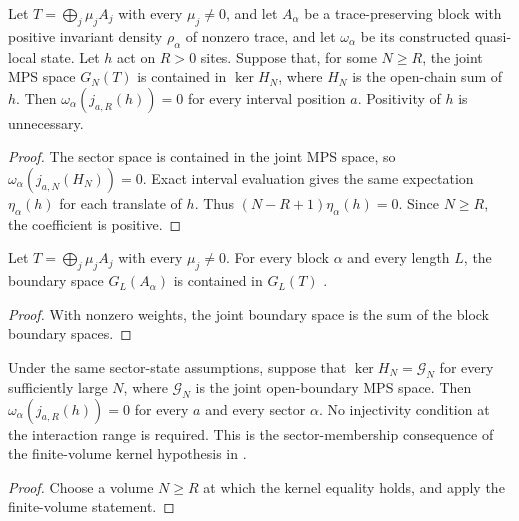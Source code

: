 \begin{lemma}
    \label{thm:sector_local_zero_from_open_kernel}
    \leanok
    Let $T=\bigoplus_j\mu_jA_j$ with every $\mu_j\neq0$, and let $A_\alpha$
    be a trace-preserving block with positive invariant density
    $\rho_\alpha$ of nonzero trace, and let $\omega_\alpha$ be its constructed
    quasi-local state. Let $h$ act on $R>0$ sites. Suppose that, for some
    $N\geq R$, the joint MPS space $G_N(T)$ is contained in $\ker H_N$, where $H_N$ is
    the open-chain sum of $h$. Then $\omega_\alpha(j_{a,R}(h))=0$ for every
    interval position $a$. Positivity of $h$ is unnecessary.
\end{lemma}
\begin{proof}\leanok
    The sector space is contained in the joint MPS space, so
    $\omega_\alpha(j_{a,N}(H_N))=0$. Exact interval evaluation gives the
    same expectation $\eta_\alpha(h)$ for each translate of $h$. Thus
    $(N-R+1)\eta_\alpha(h)=0$. Since $N\geq R$, the coefficient is positive.
\end{proof}

\begin{lemma}
    \label{thm:block_ground_space_le_joint}
    \leanok
    Let $T=\bigoplus_j\mu_jA_j$ with every $\mu_j\neq0$. For every block
    $\alpha$ and every length $L$, the boundary space $G_L(A_\alpha)$ is
    contained in $G_L(T)$ \cite[Lemma~commutation~(ii)]{Nachtergaele1996Spectral}.
\end{lemma}
\begin{proof}\leanok
    With nonzero weights, the joint boundary space is the sum of the block
    boundary spaces.
\end{proof}

\begin{lemma}
    \label{thm:sector_local_zero_from_eventual_open_kernel}
    \leanok
    Under the same sector-state assumptions, suppose that
    $\ker H_N=\mathcal G_N$ for every sufficiently large $N$, where
    $\mathcal G_N$ is the joint open-boundary MPS space. Then
    $\omega_\alpha(j_{a,R}(h))=0$ for every $a$ and every sector $\alpha$.
    No injectivity condition at the interaction range is required.
    This is the sector-membership consequence of the finite-volume kernel
    hypothesis in \cite[Theorem~1.2]{Nachtergaele1996Spectral}.
\end{lemma}
\begin{proof}\leanok
    Choose a volume $N\geq R$ at which the kernel equality holds, and apply
    the finite-volume statement.
\end{proof}

